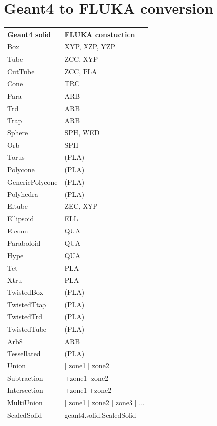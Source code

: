 \documentclass[final,5p,times,twocolumn]{elsarticle}
\begin{document}
\section{Geant4 to FLUKA conversion}

\begin{table}[hbt!]
\centering
\begin{tabular}{| l | l | } \hline
Geant4 solid			& FLUKA constuction			\\ \hline
Box					& XYP, XZP, YZP 				\\
Tube					& ZCC, XYP	 				\\
CutTube				& ZCC, PLA					\\
Cone				& TRC						\\
Para					& ARB						\\
Trd					& ARB						\\
Trap					& ARB						\\
Sphere				& SPH, WED					\\
Orb					& SPH						\\
Torus				& (PLA)						\\
Polycone				& (PLA)						\\
GenericPolycone		& (PLA)						\\
Polyhedra				& (PLA)						\\
Eltube				& ZEC, XYP					\\
Ellipsoid				& ELL						\\
Elcone				& QUA						\\
Paraboloid			& QUA						\\
Hype					& QUA						\\
Tet					& PLA						\\
Xtru					& PLA						\\
TwistedBox			& (PLA)						\\
TwistedTtap			& (PLA)						\\
TwistedTrd			& (PLA)				 		\\
TwistedTube			& (PLA)						\\
Arb8					& ARB						\\
Tessellated			& (PLA)					 	\\
Union				& | zone1 | zone2				\\
Subtraction			& +zone1 -zone2				\\
Intersection			& +zone1 +zone2				\\
MultiUnion			& | zone1 | zone2 | zone3 | ...	\\
ScaledSolid			& geant4.solid.ScaledSolid		\\ \hline				
\end{tabular}
\end{table}
\end{document}
